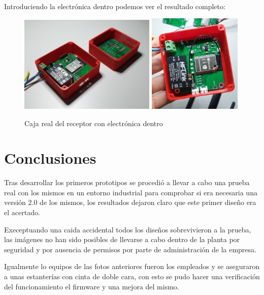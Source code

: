 \documentclass[paper=a4, fontsize=11pt,twoside]{scrartcl}
\begin{document}
        \paragraph{}
        Introduciendo la electrónica dentro podemos ver el resultado completo:
        \begin{center}
            \begin{figure}[h]
                \centering
                \includegraphics[width=0.58\textwidth]{../3d_master_2_box.jpeg}
                \includegraphics[width=0.4\textwidth]{../3d_antenna.jpeg}
                \caption{Caja real del receptor con electrónica dentro}
                \label{fig:mesh1}
            \end{figure}    
        \end{center}
\section{Conclusiones}
    Tras desarrollar los primeros prototipos se procedió a llevar a cabo una prueba real con los mismos 
    en un entorno industrial para comprobar si era necesaria una versión 2.0 de los mismos, los resultados
    dejaron claro que este primer diseño era el acertado.

    Execeptuando una caida accidental todos los diseños sobrevivieron a la prueba, las imágenes no han sido posibles 
    de llevarse a cabo dentro de la planta por seguridad y por ausencia de permisos por parte de administración de la empresa.

    Igualmente lo equipos de las fotos anteriores fueron los empleados y se aseguraron a unas estanterías con cinta de doble cara, con
    esto se pudo hacer una verificación del funcionamiento el firmware y una mejora del mismo.
\end{document}

